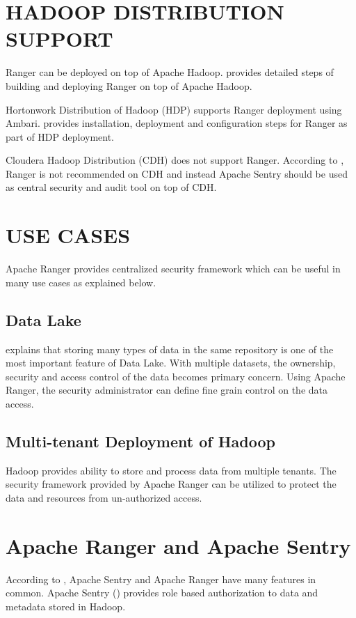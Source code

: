 \documentclass[9pt,twocolumn,twoside]{../../styles/osajnl}
\begin{document}
\section{HADOOP DISTRIBUTION SUPPORT}
Ranger can be deployed on top of Apache Hadoop.
\cite{www-ranger-on-apache-hadoop} provides detailed steps of building and
deploying Ranger on top of Apache Hadoop.

Hortonwork Distribution of Hadoop (HDP) supports Ranger deployment using
Ambari. \cite{www-ranger-on-hdp} provides installation, deployment and
configuration steps for Ranger as part of HDP deployment.

Cloudera Hadoop Distribution (CDH) does not support Ranger. According to
\cite{www-ranger-on-cdh}, Ranger is not recommended on CDH and instead Apache
Sentry should be used as central security and audit tool on top of CDH.

\section{USE CASES}
Apache Ranger provides centralized security framework which can be useful in
many use cases as explained below.

\subsection{Data Lake}
\cite{data-lake-whitepaper} explains that storing many types of data in the
same repository is one of the most important feature of Data Lake\SE. With
multiple datasets, the ownership, security and access control of the data
becomes primary concern. Using Apache Ranger, the security administrator can
define fine grain control on the data access.



\subsection{Multi-tenant Deployment of Hadoop}
Hadoop provides ability to store and process data from multiple
tenants. The security framework provided by Apache Ranger can be utilized to
protect the data and resources from un-authorized access.

\section{Apache Ranger and Apache Sentry}
According to \cite{www-5security-blog}, Apache Sentry and Apache Ranger have
many features in common. Apache Sentry (\cite{www-apache-sentry}) provides
role based authorization to data and metadata stored in Hadoop.
\end{document}
